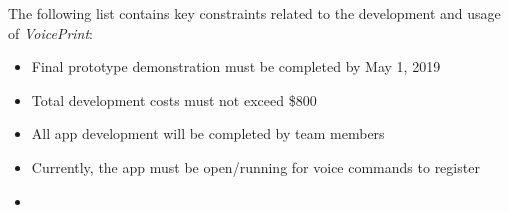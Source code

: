 The following list contains key constraints related to the development and usage of \textit{VoicePrint}:

\begin{itemize}
  \item Final prototype demonstration must be completed by May 1, 2019
  \item Total development costs must not exceed \$800
  \item All app development will be completed by team members
  \item Currently, the app must be open/running for voice commands to register
  \item 
\end{itemize}